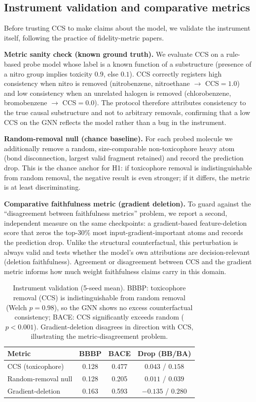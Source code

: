 \documentclass[a4paper,fleqn]{cas-dc}
\begin{document}
\subsection{Instrument validation and comparative metrics}
\label{sec:sanity}
Before trusting CCS to make claims about the model, we validate the instrument itself, following the practice of fidelity-metric papers.

\textbf{Metric sanity check (known ground truth).} We evaluate CCS on a rule-based probe model whose label is a known function of a substructure (presence of a nitro group implies toxicity $0.9$, else $0.1$). CCS correctly registers high consistency when nitro is removed (nitrobenzene, nitroethane $\to$ CCS$=1.0$) and low consistency when an unrelated halogen is removed (chlorobenzene, bromobenzene $\to$ CCS$=0.0$). The protocol therefore attributes consistency to the true causal substructure and not to arbitrary removals, confirming that a low CCS on the GNN reflects the model rather than a bug in the instrument.

\textbf{Random-removal null (chance baseline).} For each probed molecule we additionally remove a random, size-comparable non-toxicophore heavy atom (bond disconnection, largest valid fragment retained) and record the prediction drop. This is the chance anchor for H1: if toxicophore removal is indistinguishable from random removal, the negative result is even stronger; if it differs, the metric is at least discriminating.

\textbf{Comparative faithfulness metric (gradient deletion).} To guard against the ``disagreement between faithfulness metrics'' problem, we report a second, independent measure on the same checkpoints: a gradient-based feature-deletion score that zeros the top-$30\%$ most input-gradient-important atoms and records the prediction drop. Unlike the structural counterfactual, this perturbation is always valid and tests whether the model's own attributions are decision-relevant (deletion faithfulness). Agreement or disagreement between CCS and the gradient metric informs how much weight faithfulness claims carry in this domain.

\begin{table}[t]
\centering
\caption{Instrument validation (5-seed mean). BBBP: toxicophore removal (CCS) is indistinguishable from random removal (Welch $p=0.98$), so the GNN shows no excess counterfactual consistency; BACE: CCS significantly exceeds random ($p<0.001$). Gradient-deletion disagrees in direction with CCS, illustrating the metric-disagreement problem.}
\label{tab:validate}
\begin{tabular}{@{}l c c c@{}}
\toprule
Metric & BBBP & BACE & Drop (BB/BA) \\
\midrule
CCS (toxicophore) & 0.128 & 0.477 & $0.043$ / $0.158$ \\
Random-removal null & 0.128 & 0.205 & $0.011$ / $0.039$ \\
Gradient-deletion & 0.163 & 0.593 & $-0.135$ / $0.280$ \\
\bottomrule
\end{tabular}
\end{table}
\end{document}
